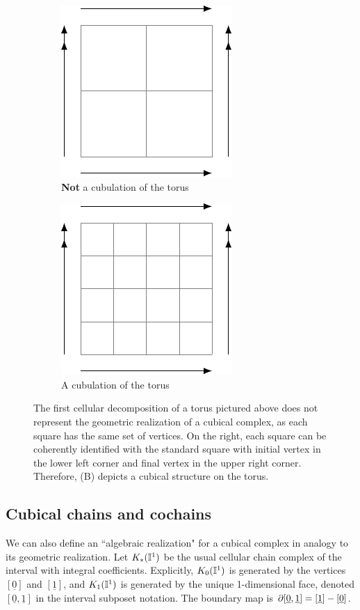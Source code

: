\begin{figure}[h]
	\begin{subfigure}{.4\textwidth}
		\centering
		\includegraphics{figures/torus1.pdf}
		\caption{\textbf{Not} a cubulation of the torus}
	\end{subfigure}\qquad
	\begin{subfigure}{.4\textwidth}
		\centering
		\includegraphics{figures/torus2.pdf}
		\caption{A cubulation of the torus}
	\end{subfigure}
	\caption{The first cellular decomposition of a torus pictured above does not represent the geometric realization of a cubical complex, as each square has the same set of vertices. On the right, each square can be coherently identified with the standard square with initial vertex in the lower left corner and final vertex in the upper right corner. Therefore, (B) depicts a cubical structure on the torus.}
	\label{F: cubical structure}
\end{figure}

\subsection{Cubical chains and cochains}\label{S: cubical cochains}

We can also define an ``algebraic realization" for a cubical complex in analogy to its geometric realization.
Let $K_*(\mathbb{I}^1)$ be the usual cellular chain complex of the interval with integral coefficients.
Explicitly, $K_0(\mathbb{I}^1)$ is generated by the vertices $[\underline{0}]$ and $[\underline{1}]$, and $K_1(\mathbb{I}^1)$ is generated by the unique 1-dimensional face, denoted $[\underline{0},\underline{1}]$ in the interval subposet notation. The boundary map is $\partial [\underline{0},\underline{1}] = [\underline{1}]-[\underline{0}]$.

